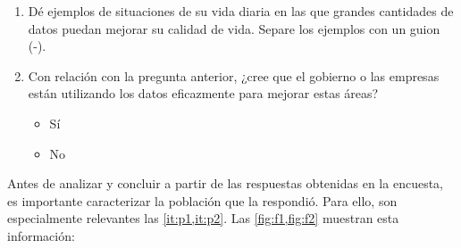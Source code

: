 \documentclass[12pt,a4paper]{article}
\begin{document}
\begin{enumerate}
    \item \label{it:p10} Dé ejemplos de situaciones de su vida diaria en las que grandes cantidades de datos puedan
     mejorar su calidad de vida. Separe los ejemplos con un guion (-).
    \item \label{it:p11} Con relación con la pregunta anterior, ¿cree que el gobierno o las empresas están utilizando 
    los datos eficazmente para mejorar estas áreas?
    \begin{itemize}
        \item Sí
        \item No
    \end{itemize}
\end{enumerate}

Antes de analizar y concluir a partir de las respuestas obtenidas en la encuesta, 
es importante caracterizar la población que la respondió. Para ello, son especialmente relevantes las \cref{it:p1,it:p2}. 
Las \cref{fig:f1,fig:f2} muestran esta información:
\end{document}

